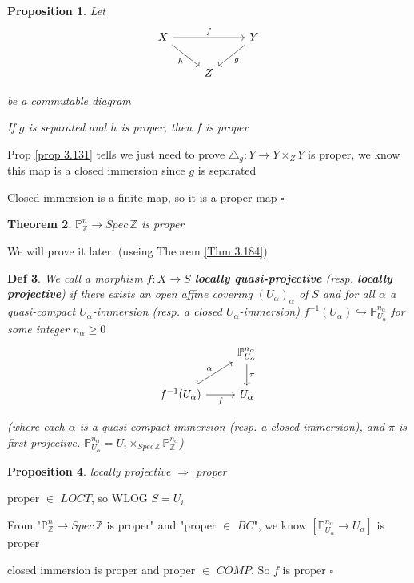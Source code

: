 \documentclass{article}
\newtheorem{theorem}{Theorem}[section]
\newtheorem{definition}[theorem]{Def}
\newtheorem{proposition}[theorem]{Proposition}
\newenvironment{Proof}{{\noindent \indent \it Proof:\quad}}{\hfill $\square$\par}
\begin{document}
\begin{proposition}
    Let
    \[\begin{tikzcd}
	X && Y \\
	& Z
	\arrow["h"', from=1-1, to=2-2]
	\arrow["f", from=1-1, to=1-3]
	\arrow["g", from=1-3, to=2-2]
\end{tikzcd}\]

be a commutable diagram

If $g$ is separated and $h$ is proper, then $f$ is proper
\end{proposition}
\begin{Proof}
    Prop \ref{prop 3.131} tells we just need to prove $\triangle_g:Y\to Y\times_Z Y$ is proper, we know this map is a closed immersion since $g$ is separated

    Closed immersion is a finite map, so it is a proper map
\end{Proof}

\begin{theorem}
    $\mathbb P^n_{\mathbb Z}\to Spec\,\mathbb Z$ is proper
    \
    \label{Thm 3.172}
\end{theorem}

We will prove it later. (useing Theorem \ref{Thm 3.184})

\begin{definition}
We call a morphism $f : X \to S$ \textbf{locally quasi-projective} (resp. \textbf{locally
projective}) if there exists an open affine covering $(U_\alpha)_\alpha$ of $S$ and for all $\alpha$ a quasi-compact
$U_\alpha$-immersion (resp. a closed $U_\alpha$-immersion) $f^{-1}(U_\alpha) \hookrightarrow \mathbb P^{n_\alpha}
_{U_\alpha}$ for some integer $n_\alpha \geq 0$
\[\begin{tikzcd}
	& {\mathbb P^{n_\alpha} _{U_\alpha}} \\
	{f^{-1}(U_\alpha)} & {U_\alpha}
	\arrow["f"', from=2-1, to=2-2]
	\arrow["\alpha", hook, from=2-1, to=1-2]
	\arrow["\pi", from=1-2, to=2-2]
\end{tikzcd}\]

(where each $\alpha$ is a quasi-compact
immersion (resp. a closed immersion), and $\pi$ is first projective. $\mathbb P^{n_\alpha} _{U_\alpha}=U_i\times_{Spec\,\mathbb Z}\mathbb P^{n_\alpha} _{\mathbb Z}$)
\end{definition}

\begin{proposition}
    locally projective $\Rightarrow$ proper
\end{proposition}
\begin{Proof}
    proper $\in$ $LOCT$, so WLOG $S=U_i$

    From "$\mathbb P^n_{\mathbb Z}\to Spec\,\mathbb Z$ is proper" and "proper $\in$ $BC$", we know $[\mathbb P_{U_\alpha}^{n_\alpha}\to U_\alpha]$ is proper

    closed immersion is proper and proper $\in$ $COMP$. So $f$ is proper
\end{Proof}
\end{document}
